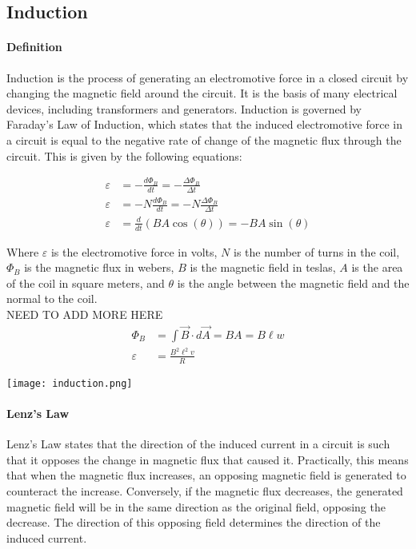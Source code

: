 \subsection{Induction}
\hrulefill

\paragraph*{Definition}
Induction is the process of generating an electromotive force in a closed circuit by changing the magnetic field around the circuit.
It is the basis of many electrical devices, including transformers and generators. Induction is governed by Faraday's Law of Induction,
which states that the induced electromotive force in a circuit is equal to the negative rate of change of the magnetic flux through 
the circuit. This is given by the following equations:

\begin{align*}
    \varepsilon &= -\frac{d\Phi_B}{dt} = -\frac{\Delta \Phi_B}{\Delta t}\\
    \varepsilon &= -N\frac{d\Phi_B}{dt} = -N\frac{\Delta \Phi_B}{\Delta t}\\
    \varepsilon &= \frac{d}{dt}(BA\cos(\theta)) = -BA\sin(\theta)
\end{align*}

Where $\varepsilon$ is the electromotive force in volts, $N$ is the number of turns in the coil, $\Phi_B$ is the magnetic flux in webers, $B$ is the magnetic field in teslas, $A$ is the area of the coil in square meters, and $\theta$ is the angle between the magnetic field and the normal to the coil.\\

NEED TO ADD MORE HERE
\begin{align*}
    \Phi_B &= \int \vec{B} \cdot d\vec{A} = BA = B\ell w\\
    \varepsilon &= \frac{B^2\ell^2v}{R}
\end{align*}

\begin{center}
    \texttt{[image: induction.png]}
\end{center}

\paragraph*{Lenz's Law}
Lenz's Law states that the direction of the induced current in a circuit is such that it opposes the change in magnetic flux that caused it. 
Practically, this means that when the magnetic flux increases, an opposing magnetic field is generated to counteract the increase. 
Conversely, if the magnetic flux decreases, the generated magnetic field will be in the same direction as the original field, opposing the 
decrease. The direction of this opposing field determines the direction of the induced current.

